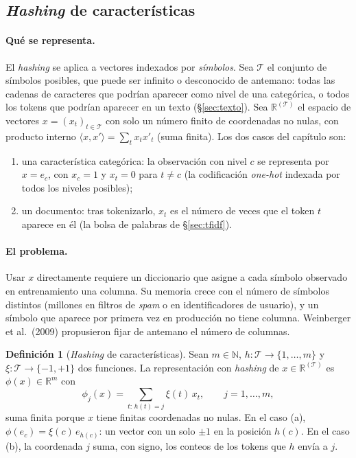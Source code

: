 \documentclass[11pt,a4paper]{article}
\theoremstyle{plain}
\theoremstyle{definition}
\newtheorem{definicion}[teorema]{Definición}
\theoremstyle{remark}
\newcommand{\R}{\mathbb{R}}
\newcommand{\N}{\mathbb{N}}
\newcommand{\1}{\mathbf{1}}
\begin{document}
\subsection{\emph{Hashing} de características}\label{sec:hashing}

\paragraph{Qué se representa.} El \emph{hashing} se aplica a vectores
indexados por \emph{símbolos}. Sea $\mathcal T$ el conjunto de símbolos
posibles, que puede ser infinito o desconocido de antemano: todas las
cadenas de caracteres que podrían aparecer como nivel de una categórica, o
todos los tokens que podrían aparecer en un texto (\S\ref{sec:texto}). Sea
$\R^{(\mathcal T)}$ el espacio de vectores $x=(x_t)_{t\in\mathcal T}$ con
solo un número finito de coordenadas no nulas, con producto interno
$\langle x,x'\rangle=\sum_tx_tx'_t$ (suma finita). Los dos casos del
capítulo son:
\begin{enumerate}[label=(\alph*)]
\item una característica categórica: la observación con nivel $c$ se
representa por $x=e_c$, con $x_c=1$ y $x_t=0$ para $t\ne c$ (la
codificación \emph{one-hot} indexada por todos los niveles posibles);
\item un documento: tras tokenizarlo, $x_t$ es el número de veces que el
token $t$ aparece en él (la bolsa de palabras de \S\ref{sec:tfidf}).
\end{enumerate}

\paragraph{El problema.} Usar $x$ directamente requiere un diccionario que
asigne a cada símbolo observado en entrenamiento una columna. Su memoria
crece con el número de símbolos distintos (millones en filtros de
\emph{spam} o en identificadores de usuario), y un símbolo que aparece por
primera vez en producción no tiene columna. Weinberger et al.\ (2009)
propusieron fijar de antemano el número de columnas.

\begin{definicion}[\emph{Hashing} de características]
Sean $m\in\N$, $h:\mathcal T\to\{1,\dots,m\}$ y
$\xi:\mathcal T\to\{-1,+1\}$ dos funciones. La representación con
\emph{hashing} de $x\in\R^{(\mathcal T)}$ es $\phi(x)\in\R^m$ con
\[
\phi_j(x)=\sum_{t:\,h(t)=j}\xi(t)\,x_t,\qquad j=1,\dots,m,
\]
suma finita porque $x$ tiene finitas coordenadas no nulas. En el caso (a),
$\phi(e_c)=\xi(c)\,e_{h(c)}$: un vector con un solo $\pm1$ en la
posición $h(c)$. En el caso (b), la coordenada $j$ suma, con signo, los
conteos de los tokens que $h$ envía a $j$.
\end{definicion}
\end{document}
